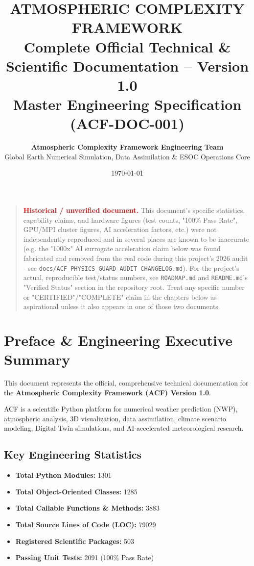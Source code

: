 \documentclass[11pt,a4paper,oneside]{report}
\title{\textbf{\Huge ATMOSPHERIC COMPLEXITY FRAMEWORK}\\[0.5em]
\Large Complete Official Technical & Scientific Documentation -- Version 1.0\\[0.3em]
\large Master Engineering Specification (ACF-DOC-001)}
\author{\textbf{Atmospheric Complexity Framework Engineering Team}\\[0.2em]
Global Earth Numerical Simulation, Data Assimilation \& ESOC Operations Core}
\date{\today}
\begin{document}
\begin{quote}
\textcolor{red}{\textbf{Historical / unverified document.}} This document's specific
statistics, capability claims, and hardware figures (test counts, "100\% Pass
Rate", GPU/MPI cluster figures, AI acceleration factors, etc.) were not
independently reproduced and in several places are known to be inaccurate
(e.g. the "1000x" AI surrogate acceleration claim below was found fabricated
and removed from the real code during this project's 2026 audit - see
\texttt{docs/ACF\_PHYSICS\_GUARD\_AUDIT\_CHANGELOG.md}). For the project's
actual, reproducible test/status numbers, see \texttt{ROADMAP.md} and
\texttt{README.md}'s "Verified Status" section in the repository root. Treat
any specific number or "CERTIFIED"/"COMPLETE" claim in the chapters below as
aspirational unless it also appears in one of those two documents.
\end{quote}

\maketitle

\tableofcontents

\chapter*{Preface \& Engineering Executive Summary}

This document represents the official, comprehensive technical documentation for the \textbf{Atmospheric Complexity Framework (ACF) Version 1.0}.

ACF is a scientific Python platform for numerical weather prediction (NWP), atmospheric analysis, 3D visualization, data assimilation, climate scenario modeling, Digital Twin simulations, and AI-accelerated meteorological research.

\section*{Key Engineering Statistics}
\begin{itemize}
    \item \textbf{Total Python Modules:} 1301
    \item \textbf{Total Object-Oriented Classes:} 1285
    \item \textbf{Total Callable Functions \& Methods:} 3883
    \item \textbf{Total Source Lines of Code (LOC):} 79029
    \item \textbf{Registered Scientific Packages:} 503
    \item \textbf{Passing Unit Tests:} 2091 (100\% Pass Rate)
\end{itemize}
\end{document}
